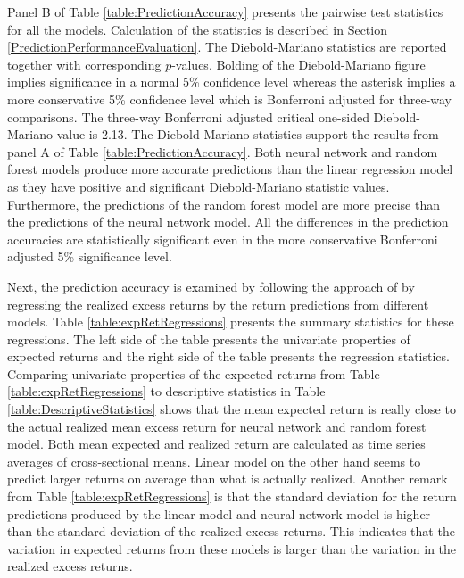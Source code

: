 \documentclass[12pt]{article}
\begin{document}
Panel B of Table \ref{table:PredictionAccuracy} presents the pairwise \citet{Diebold1995} test statistics for all the models. Calculation of the statistics is described in Section \ref{PredictionPerformanceEvaluation}. The Diebold-Mariano statistics are reported together with corresponding $p$-values. Bolding of the Diebold-Mariano figure implies significance in a normal 5\% confidence level whereas the asterisk implies a more conservative 5\% confidence level which is Bonferroni adjusted for three-way comparisons. The three-way Bonferroni adjusted critical one-sided Diebold-Mariano value is 2.13. The Diebold-Mariano statistics support the results from panel A of Table \ref{table:PredictionAccuracy}. Both neural network and random forest models produce more accurate predictions than the linear regression model as they have positive and significant Diebold-Mariano statistic values. Furthermore, the predictions of the random forest model are more precise than the predictions of the neural network model. All the differences in the prediction accuracies are statistically significant even in the more conservative Bonferroni adjusted 5\% significance level. \par

Next, the prediction accuracy is examined by following the approach of \citet{Lewellen2015} by regressing the realized excess returns by the return predictions from different models.\footnotemark {} Table \ref{table:expRetRegressions} presents the summary statistics for these regressions. The left side of the table presents the univariate properties of expected returns and the right side of the table presents the regression statistics. Comparing univariate properties of the expected returns from Table \ref{table:expRetRegressions} to descriptive statistics in Table \ref{table:DescriptiveStatistics} shows that the mean expected return is really close to the actual realized mean excess return for neural network and random forest model. Both mean expected and realized return are calculated as time series averages of cross-sectional means. Linear model on the other hand seems to predict larger returns on average than what is actually realized. Another remark from Table \ref{table:expRetRegressions} is that the standard deviation for the return predictions produced by the linear model and neural network model is higher than the standard deviation of the realized excess returns. This indicates that the variation in expected returns from these models is larger than the variation in the realized excess returns. \par
\end{document}
